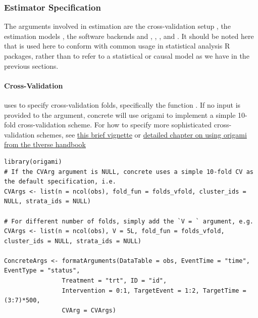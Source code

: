\documentclass{report}
\newcommand{\1}{\ensuremath{\mathbf{1}}}
\begin{document}
\subsubsection{Estimator Specification}
\label{EstimationSpec}
The arguments involved in estimation are the cross-validation setup , the estimation models , the software backends  and , , , and . It should be noted here that  is used here to conform with common usage in statistical analysis R packages, rather than to refer to a statistical or causal model as we have in the previous sections. 

\paragraph{Cross-Validation}
\label{CV}
 uses  to specify cross-validation folds, specifically the function
. If no input is provided to the  argument, concrete will use origami to implement a simple 10-fold cross-validation scheme. For how to specify more sophisticated cross-validation schemes, see \href{https://tlverse.org/origami/articles/generalizedCV.html}{this brief vignette} or \href{https://tlverse.org/tlverse-handbook/origami.html}{detailed chapter on using origami from the tlverse handbook}

\begin{lstlisting}
library(origami)
# If the CVArg argument is NULL, concrete uses a simple 10-fold CV as the default specification, i.e.
CVArgs <- list(n = ncol(obs), fold_fun = folds_vfold, cluster_ids = NULL, strata_ids = NULL)

# For different number of folds, simply add the `V = ` argument, e.g. 
CVArgs <- list(n = ncol(obs), V = 5L, fold_fun = folds_vfold, cluster_ids = NULL, strata_ids = NULL)

ConcreteArgs <- formatArguments(DataTable = obs, EventTime = "time", EventType = "status", 
				Treatment = "trt", ID = "id", 
				Intervention = 0:1, TargetEvent = 1:2, TargetTime = (3:7)*500, 
				CVArg = CVArgs)
\end{lstlisting}
\end{document}
